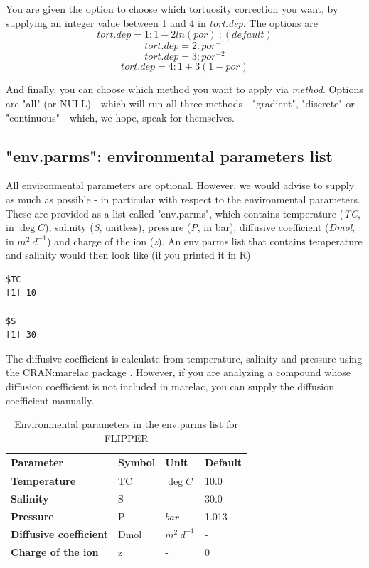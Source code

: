 \documentclass[10pt]{article}
\begin{document}
You are given the option to choose which tortuosity correction you want, by supplying an integer value between 1 and 4 in \textit{tort.dep}. The options are
\begin{equation}
tort.dep=1: 1-2ln(por) \:: (default) 
\end{equation}
\begin{equation}
tort.dep=2: por^{-1} 
\end{equation}
\begin{equation}
tort.dep=3: por^{-2} 
\end{equation}
\begin{equation}
tort.dep=4: 1+3(1-por)
\end{equation}

And finally, you can choose which method you want to apply via \textit{method}. Options are "all" (or NULL) - which will run all three methods - "gradient", "discrete" or "continuous" - which, we hope, speak for themselves.

\subsection{"env.parms": environmental parameters list}
All environmental parameters are optional. However, we would advise to supply as much as possible - in particular with respect to the environmental parameters. These are provided as a list called "env.parms", which contains temperature (\textit{TC}, in $\deg C$), salinity (\textit{S}, unitless), pressure (\textit{P}, in bar), diffusive coefficient (\textit{Dmol}, in $m^2 \: d^{-1}$) and charge of the ion (\textit{z}). An env.parms list that contains temperature and salinity would then look like (if you printed it in R)
\begin{verbatim}
$TC
[1] 10

$S
[1] 30
\end{verbatim} 
The diffusive coefficient is calculate from temperature, salinity and pressure using the CRAN:marelac package \cite{Soetaert2010}. However, if you are analyzing a compound whose diffusion coefficient is not included in marelac, you can supply the diffusion coefficient manually.

\begin{table}[!h]
	\small
	\caption{Environmental parameters in the env.parms list for FLIPPER}
	\begin{tabular}{p{5cm} p{1.5cm} p{2cm} p{2cm}}
		\hline
		\textbf{Parameter} & \textbf{Symbol} & \textbf{Unit} & \textbf{Default} \\     
		 \hline
		\textbf{Temperature} & TC & $\deg C$ & 10.0  \\
		\textbf{Salinity} & S & - & 30.0  \\
		\textbf{Pressure} & P & $bar$ & 1.013  \\
		\textbf{Diffusive coefficient} & Dmol & $m^2 \: d^{-1}$ & -  \\
		\textbf{Charge of the ion} & z & - & 0  \\
		\hline
	\end{tabular}
	\label{table_envparms}
\end{table}
\end{document}
